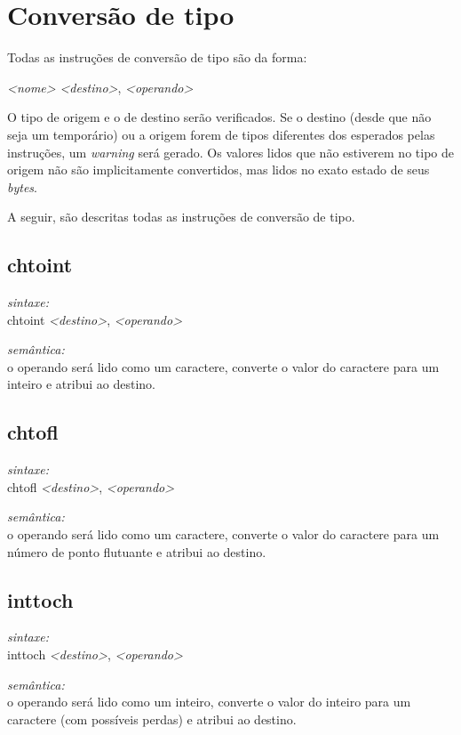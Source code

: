 \documentclass[12pt,a4paper,extrafontsizes,article]{memoir}
\newcommand*{\srcfont}{\fontfamily{pcr}\selectfont}
\begin{document}
\section{Conversão de tipo}

Todas as instruções de conversão de tipo são da forma:

\bigskip
{\srcfont\scriptsize \textit{<nome>} \textit{<destino>}, \textit{<operando>}}
\bigskip

O tipo de origem e o de destino serão verificados. Se o destino (desde que não seja um temporário) ou a origem forem de
tipos diferentes dos esperados pelas instruções, um \textit{warning} será gerado. Os valores lidos que não estiverem
no tipo de origem não são implicitamente convertidos, mas lidos no exato estado de seus \textit{bytes}.

A seguir, são descritas todas as instruções de conversão de tipo.


\subsection{\textbf{chtoint}}

\textit{sintaxe:}\\{\srcfont chtoint \textit{<destino>}, \textit{<operando>}}

\noindent \textit{semântica:}\\o operando será lido como um caractere, converte o valor do caractere para um inteiro e atribui ao destino.


\subsection{\textbf{chtofl}}

\textit{sintaxe:}\\{\srcfont chtofl \textit{<destino>}, \textit{<operando>}}

\noindent \textit{semântica:}\\o operando será lido como um caractere, converte o valor do caractere para um número de ponto flutuante e
atribui ao destino.


\subsection{\textbf{inttoch}}

\textit{sintaxe:}\\{\srcfont inttoch \textit{<destino>}, \textit{<operando>}}

\noindent \textit{semântica:}\\o operando será lido como um inteiro, converte o valor do inteiro para um caractere (com possíveis perdas) e
atribui ao destino.
\end{document}
